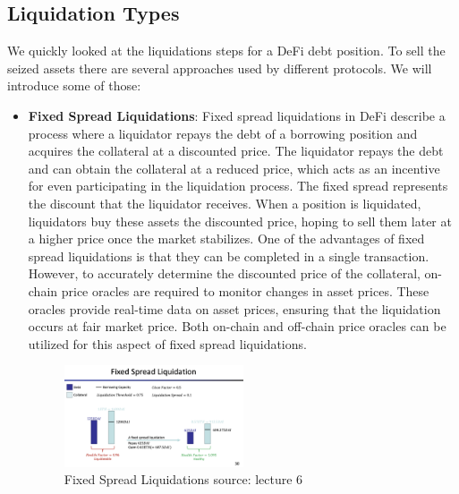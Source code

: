 \documentclass{article}
\begin{document}
\subsection{Liquidation Types}
We quickly looked at the liquidations steps for a DeFi debt position. To sell the seized assets there are several approaches used by different protocols. We will introduce some of those:
\begin{itemize}

\item \textbf{Fixed Spread Liquidations}:%
Fixed spread liquidations in DeFi describe a process where a liquidator repays the debt of a borrowing position and acquires the collateral at a discounted price. The liquidator repays the debt and can obtain the collateral at a reduced price, which acts as an incentive for even participating in the liquidation process. The fixed spread represents the discount that the liquidator receives. When a position is liquidated, liquidators buy these assets the discounted price, hoping to sell them later at a higher price once the market stabilizes. One of the advantages of fixed spread liquidations is that they can be completed in a single transaction. However, to accurately determine the discounted price of the collateral, on-chain price oracles are required to monitor changes in asset prices. These oracles provide real-time data on asset prices, ensuring that the liquidation occurs at fair market price. Both on-chain and off-chain price oracles can be utilized for this aspect of fixed spread liquidations.
\begin{figure}[h]
    \centering
    \includegraphics[width=0.5\textwidth]{Bildschirmfoto 2024-04-07 um 17.47.44.png} 
    \caption{Fixed Spread Liquidations \scriptsize{source: lecture 6}}
    \label{fig:DoS-attack}
\end{figure}



\end{itemize}
\end{document}
